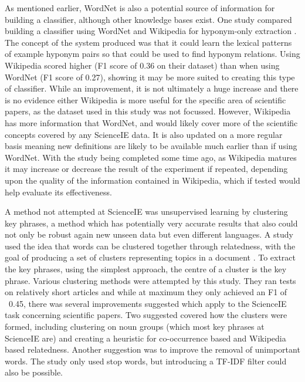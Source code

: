 As mentioned earlier, WordNet is also a potential source of information for building a classifier, although other knowledge bases exist. One study compared building a classifier using WordNet and Wikipedia for hyponym-only extraction \cite{Snow2004}. The concept of the system produced was that it could learn the lexical patterns of example hyponym pairs so that could be used to find hyponym relations. Using Wikipedia scored higher (F1 score of 0.36 on their dataset) than when using WordNet (F1 score of 0.27), showing it may be more suited to creating this type of classifier. While an improvement, it is not ultimately a huge increase and there is no evidence either Wikipedia is more useful for the specific area of scientific papers, as the dataset used in this study was not focussed. However, Wikipedia has more information that WordNet, and would likely cover more of the scientific concepts covered by any ScienceIE data. It is also updated on a more regular basis meaning new definitions are likely to be available much earlier than if using WordNet. With the study being completed some time ago, as Wikipedia matures it may increase or decrease the result of the experiment if repeated, depending upon the quality of the information contained in Wikipedia, which if tested would help evaluate its effectiveness.

A method not attempted at ScienceIE was unsupervised learning by clustering key phrases, a method which has potentially very accurate results that also could not only be robust again new unseen data but even different languages. A study used the idea that words can be clustered together through relatedness, with the goal of producing a set of clusters representing topics in a document \cite{Liu2009}. To extract the key phrases, using the simplest approach, the centre of a cluster is the key phrase. Various clustering methods were attempted by this study. They ran tests on relatively short articles and while at maximum they only achieved an F1 of ~0.45, there was several improvements suggested which apply to the ScienceIE task concerning scientific papers. Two suggested covered how the clusters were formed, including clustering on noun groups (which most key phrases at ScienceIE are) and creating a heuristic for co-occurrence based and Wikipedia based relatedness. Another suggestion was to improve the removal of unimportant words. The study only used stop words, but introducing a TF-IDF filter could also be possible.


